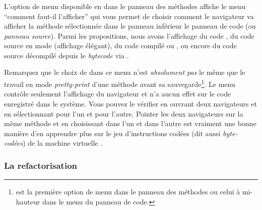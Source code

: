 \documentclass[a4paper,10pt,twoside]{book}
\begin{document}
\subsubsection{}

L'option de menu  
disponible en \actclickant{} dans le panneau des méthodes
affiche le menu ``comment faut-il l'afficher''
qui vous permet de choisir comment le navigateur va afficher
la méthode sélectionnée dans le panneau inférieur \ie le panneau de code
(ou \emph{panneau source}).
Parmi les propositions, nous avons l'affichage du code , 
du code source en mode  (affichage élégant), 
du code compilé ou , ou encore du code source
décompilé depuis le \emph{bytecode} via .

Remarquez que le choix de  dans ce menu n'est
\emph{absolument pas} le même que le travail en mode \emph{pretty-print} d'une méthode
avant sa sauvegarde\footnote{ est la première option de menu 
dans le panneau des méthodes ou celui à mi-hauteur dans le menu du panneau de code.}.
Le menu contrôle seulement l'affichage du navigateur et n'a aucun effet sur
le code enregistré dans le système.
Vous pouvez le vérifier en ouvrant deux navigateurs et en sélectionnant
 pour l'un et  pour l'autre.
Pointer les deux navigateurs sur la même méthode et en choisissant
 dans l'un et  dans l'autre est vraiment
une bonne manière d'en apprendre plus sur le jeu d'instructions codées
(dit aussi \emph{byte-codées}) de la machine virtuelle \pharo. %

\subsubsection{La refactorisation}
\end{document}
